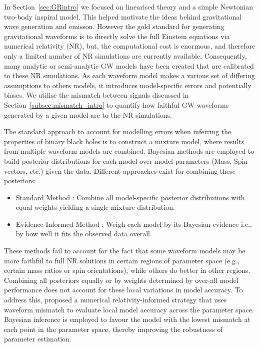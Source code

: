 \documentclass{ucdgradtaughtthesis}
\begin{document}
In Section~\ref{sec:GRintro} we focused on linearised theory and a simple Newtonian two-body inspiral model. This helped motivate the ideas behind gravitational wave generation and emisson.
However the gold standard for generating gravitational waveforms is to directly solve the full Einstein equations via numerical relativity (NR),
but, the computational cost is enormous, and therefore only a limited number of NR simulations are currently available.
Consequently, many analytic or semi-analytic GW models have been created that are calibrated to these NR simulations.
As each waveform model makes a various set of differing assumptions to others models, it introduces model-specific
errors and potentially biases.
We utilise the mismatch between signals discussed in Section~\ref{subsec:mismatch_intro} 
to quantify how faithful GW waveforms generated by a given model are to the NR simulations.
%
%

The standard approach to account for modelling errors when inferring the properties of binary black holes is to construct a mixture model, where results from multiple waveform models are combined.
Bayesian methods are employed to build posterior distributions for each model over model parameters (Mass, Spin vectors, etc.) given the data. Different approaches exist for combining these posteriors:
\begin{itemize}
    \item Standard Method \cite{linearcombination}: Combine all model-specific posterior distributions with equal weights yielding a single mixture distribution.
    \item Evidence-Informed Method \cite{Bayesianapproach}: Weigh each model by its Bayesian evidence i.e., by how well it fits the observed data overall. 
\end{itemize}
%
%

These methods fail to account for the fact that some waveform models may be more faithful to full NR solutions in certain regions of parameter space (e.g., certain mass ratios or spin orientations),
while others do better in other regions. Combining all posteriors equally or by weights determined by over-all model performance does not account for these local variations in model accuracy.
To address this, \cite{Ogpaper} proposed a numerical relativity-informed strategy that uses waveform mismatch to evaluate local model accuracy across the parameter space. 
Bayesian inference is employed to favour the model with the lowest mismatch at each point in the parameter space, thereby improving the robustness of parameter estimation.
%
\end{document}
